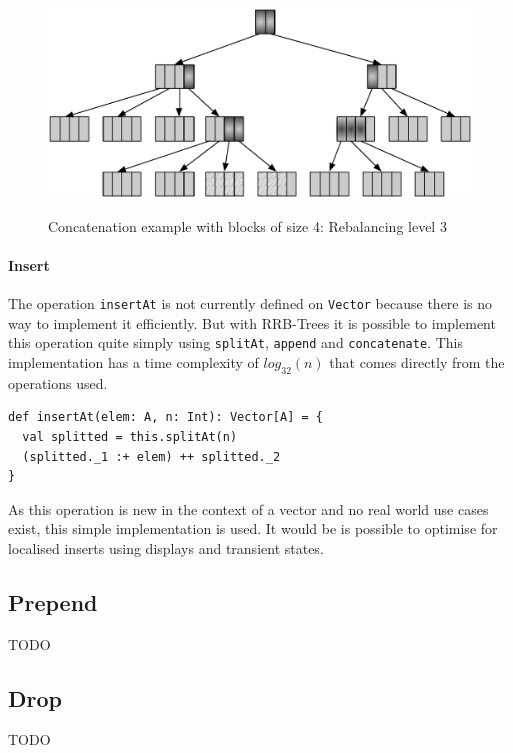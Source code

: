 \begin{figure}[h!]
  \centering
  \includegraphics[width=\textwidth]{Figures/Concat3.pdf}
  \label{Concat3Benchmarks}
  \caption{Concatenation example with blocks of size 4: Rebalancing level 3}
\end{figure}

\paragraph{Insert}
The operation \texttt{insertAt} is not currently defined on \texttt{Vector} because there is no way to implement it efficiently. But with RRB-Trees it is possible to implement this operation quite simply using \texttt{splitAt}, \texttt{append} and \texttt{concatenate}. This implementation has a time complexity of $log_{32}(n)$ that comes directly from the operations used.

\begin{lstlisting}[frame=single]
def insertAt(elem: A, n: Int): Vector[A] = {
  val splitted = this.splitAt(n)
  (splitted._1 :+ elem) ++ splitted._2
}
\end{lstlisting}

As this operation is new in the context of a vector and no real world use cases exist, this simple implementation is used. It would be is possible to optimise for localised inserts using displays and transient states.

\subsection{Prepend}
\color{red} TODO \color{black}

\subsection{Drop}
\color{red} TODO \color{black}

